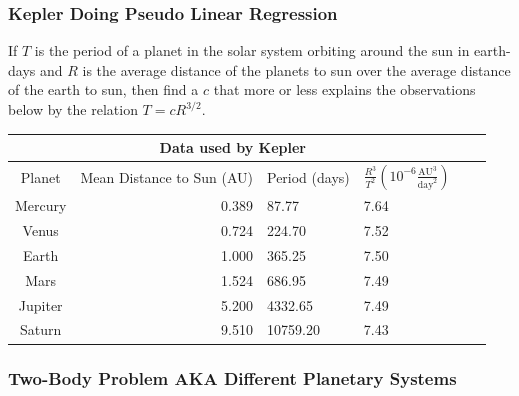       \begin{frame}
        \frametitle{Kepler Doing Pseudo Linear Regression}
        \begin{Pro}
        If $T$ is the period of a planet in the solar system orbiting around the sun in earth-days and 
        $R$ is the average distance of the planets to sun over the average distance of the earth to sun,
         then find a $c$ that more or less explains 
        the observations below by the relation $T=cR^{3/2}$.
          
        \end{Pro}
        \begin{tabular}{|c|r|p{1.3cm}|p{2cm}|p{2cm}|p{2cm}|}
          \hline
          \multicolumn{4}{|c|}{Data used by Kepler} \\
          \hline
          Planet & Mean Distance to Sun (AU) & Period (days) &$\frac{R^3}{T^2}(10^{-6}\frac{\text{AU}^3}{\text{day}^2})$\\
          \hline
          Mercury   & 0.389   & 87.77    & 7.64 \\
          Venus     &   0.724 & 224.70   & 7.52 \\
          Earth     & 1.000   & 365.25   & 7.50 \\
          Mars      & 1.524   & 686.95   & 7.49 \\
          Jupiter   &   5.200 & 4332.65  & 7.49 \\
          Saturn    & 9.510   & 10759.20 & 7.43 \\
          \hline
         \end{tabular}\label{tab:kepler_tycho_data}
        \end{frame}
    
    
    
    
            \begin{frame}
              \frametitle{Two-Body Problem AKA Different Planetary Systems}
              \end{frame}


